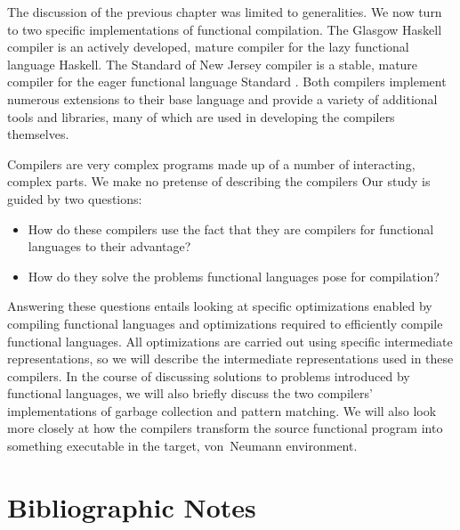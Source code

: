 \label{casestudies}
The discussion of the previous chapter was limited to generalities. We now turn to two specific implementations of functional compilation. The Glasgow Haskell compiler is an actively developed, mature compiler for the lazy functional language Haskell. The Standard \ML of New Jersey compiler is a stable, mature compiler for the eager functional language Standard \ML{}. Both compilers implement numerous extensions to their base language and provide a variety of additional tools and libraries, many of which are used in developing the compilers themselves.

Compilers are very complex programs made up of a number of interacting, complex parts. We make no pretense of describing the compilers  Our study is guided by two questions:
\begin{itemize}
\item
How do these compilers use the fact that they are compilers for functional languages to their advantage?

\item
How do they solve the problems functional languages pose for compilation?
\end{itemize}

Answering these questions entails looking at specific optimizations enabled by compiling functional languages and optimizations required to efficiently compile functional languages. All optimizations are carried out using specific intermediate representations, so we will describe the intermediate representations used in these compilers. In the course of discussing solutions to problems introduced by functional languages, we will also briefly discuss the two compilers' implementations of garbage collection and pattern matching. We will also look more closely at how the compilers transform the source functional program into something executable in the target, von~Neumann environment.





\section{Bibliographic Notes}